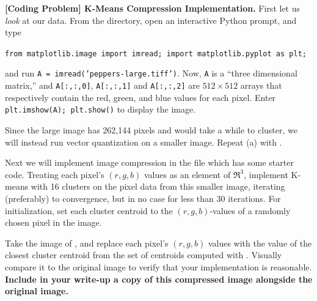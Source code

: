 \item{}
\textbf{[Coding Problem] K-Means Compression Implementation.}
First let us \emph{look} at our data. From the  directory, open an interactive Python prompt, and type
%
\begin{center}
  \texttt{from matplotlib.image import imread; import matplotlib.pyplot as plt;}
\end{center}
%
and run \texttt{A = imread('peppers-large.tiff')}. Now, \texttt{A} is a ``three dimensional matrix,'' and \texttt{A[:,:,0]}, \texttt{A[:,:,1]} and \texttt{A[:,:,2]} are $512 \times 512$ arrays that respectively contain the red, green, and blue values for each pixel. Enter \texttt{plt.imshow(A); plt.show()} to display the image.

Since the large image has 262,144 pixels and would take a while to cluster, we will instead run vector quantization on a smaller image. Repeat (a) with .


Next we will implement image compression in the file  which has some starter code. Treating each pixel's $(r, g, b)$ values as an element of $\Re^3$, implement K-means with 16 clusters on the pixel data from this smaller image, iterating (preferably) to convergence, but in no case for less than 30 iterations. For initialization, set each cluster centroid to the $(r, g, b)$-values of a randomly chosen pixel in the image.

Take the image of , and replace each pixel's $(r, g, b)$ values with the value of the closest cluster centroid from the set of centroids computed with . Visually compare it to the original image to verify that your implementation is reasonable. \textbf{Include in your write-up a copy of this compressed image alongside the original image.}
